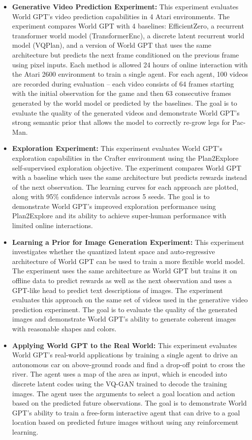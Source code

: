 \begin{itemize}
    \item \textbf{Generative Video Prediction Experiment:} This experiment evaluates World GPT's video prediction capabilities in 4 Atari environments. The experiment compares World GPT with 4 baselines: EfficientZero, a recurrent transformer world model (TransformerEnc), a discrete latent recurrent world model (VQPlan), and a version of World GPT that uses the same architecture but predicts the next frame conditioned on the previous frame using pixel inputs. Each method is allowed 24 hours of online interaction with the Atari 2600 environment to train a single agent. For each agent, 100 videos are recorded during evaluation -- each video consists of 64 frames starting with the initial observation for the game and then 63 consecutive frames generated by the world model or predicted by the baselines. The goal is to evaluate the quality of the generated videos and demonstrate World GPT's strong semantic prior that allows the model to correctly re-grow legs for Pac-Man.
    
    \item \textbf{Exploration Experiment:} This experiment evaluates World GPT's exploration capabilities in the Crafter environment using the Plan2Explore self-supervised exploration objective. The experiment compares World GPT with a baseline which uses the same architecture but predicts rewards instead of the next observation. The learning curves for each approach are plotted, along with 95\% confidence intervals across 5 seeds. The goal is to demonstrate World GPT's improved exploration performance using Plan2Explore and its ability to achieve super-human performance with limited online interactions.
    
    \item \textbf{Learning a Prior for Image Generation Experiment:} This experiment investigates whether the quantized latent space and auto-regressive architecture of World GPT can be used to train a more flexible world model. The experiment uses the same architecture as World GPT but trains it on offline data to predict rewards as well as the next observation and uses a GPT-like head to predict text descriptions of images. The experiment evaluates this approach on the same set of videos used in the generative video prediction experiment. The goal is to evaluate the quality of the generated images and demonstrate World GPT's ability to generate coherent images with reasonable shapes and colors.
    
    \item \textbf{Applying World GPT to the Real World:} This experiment evaluates World GPT's real-world applications by training a single agent to drive an autonomous car on above-ground roads and find a drop-off point to cross the river. The agent uses a map of the area as input, which is encoded into discrete latent codes using the VQ-GAN trained to decode the training images. The agent uses the arguments to select a goal location and action based on the predicted future observations. The goal is to demonstrate World GPT's ability to train a free-form interactive agent that can drive to a goal location based on predicted future images without using any reinforcement learning.
\end{itemize}
